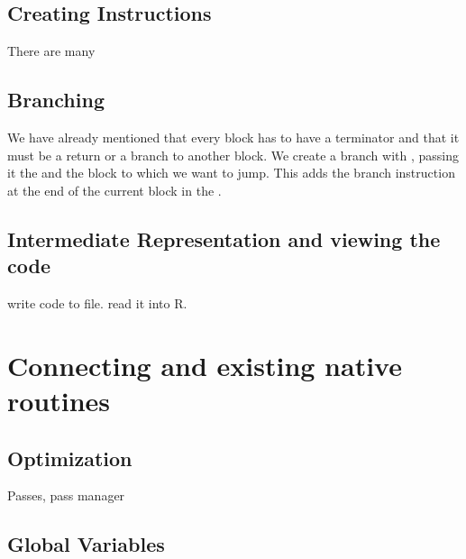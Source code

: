 \documentclass[article]{jss}
\begin{document}



\subsection{Creating Instructions}
There are many 


\subsection{Branching}
We have already mentioned that every block has to have a terminator
and that it must be a return or a branch to another block.  We create
a branch with , passing it the 
and the block to which we want to jump. This adds the branch
instruction at the end of the current block in the .


\subsection{Intermediate Representation and viewing the code}


write code to file.
read it into R.





\section[Connecting LLVM and existing native routines]{Connecting \llvm{} and existing native routines}

\subsection{Optimization}
Passes, pass manager



\subsection{Global Variables}
\end{document}

